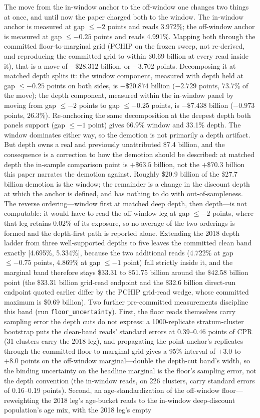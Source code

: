 \documentclass[12pt]{article}
\begin{document}
The move from the in-window anchor to the off-window one changes two things at once, and until now the paper charged both to the window. The in-window anchor is measured at gap $\leq -2$ points and reads 3.972\%; the off-window anchor is measured at gap $\leq -0.25$ points and reads 4.991\%. Mapping both through the committed floor-to-marginal grid (PCHIP on the frozen sweep, not re-derived, and reproducing the committed grid to within \$0.69 billion at every read inside it), that is a move of $-\$28.312$ billion, or $-3.702$ points. Decomposing it at matched depth splits it: the window component, measured with depth held at gap $\leq -0.25$ points on both sides, is $-\$20.874$ billion ($-2.729$ points, 73.7\% of the move); the depth component, measured within the in-window panel by moving from gap $\leq -2$ points to gap $\leq -0.25$ points, is $-\$7.438$ billion ($-0.973$ points, 26.3\%). Re-anchoring the same decomposition at the deepest depth both panels support (gap $\leq -1$ point) gives 66.9\% window and 33.1\% depth. The window dominates either way, so the demotion is not primarily a depth artifact. But depth owns a real and previously unattributed \$7.4 billion, and the consequence is a correction to how the demotion should be described: at matched depth the in-sample comparison point is $+\$63.5$ billion, not the $+\$70.3$ billion this paper narrates the demotion against. Roughly \$20.9 billion of the \$27.7 billion demotion is the window; the remainder is a change in the discount depth at which the anchor is defined, and has nothing to do with out-of-sampleness. The reverse ordering---window first at matched deep depth, then depth---is not computable: it would have to read the off-window leg at gap $\leq -2$ points, where that leg retains 0.02\% of its exposure, so no average of the two orderings is formed and the depth-first path is reported alone. Extending the 2018 depth ladder from three well-supported depths to five leaves the committed clean band exactly [4.695\%, 5.334\%], because the two additional reads (4.722\% at gap $\leq -0.75$ points, 4.869\% at gap $\leq -1$ point) fall strictly inside it, and the marginal band therefore stays \$33.31 to \$51.75 billion around the \$42.58 billion point (the \$33.31 billion grid-read endpoint and the \$32.6 billion direct-run endpoint quoted earlier differ by the PCHIP grid-read wedge, whose committed maximum is \$0.69 billion). Two further pre-committed measurements discipline this band (run \texttt{floor\_uncertainty}). First, the floor reads themselves carry sampling error the depth cuts do not express: a 1000-replicate stratum-cluster bootstrap puts the clean-band reads' standard errors at 0.39--0.46 points of CPR (31 clusters carry the 2018 leg), and propagating the point anchor's replicates through the committed floor-to-marginal grid gives a 95\% interval of $+3.0$ to $+8.0$ points on the off-window marginal---double the depth-cut band's width, so the binding uncertainty on the headline marginal is the floor's sampling error, not the depth convention (the in-window reads, on 226 clusters, carry standard errors of 0.16--0.19 points). Second, an age-standardization of the off-window floor---reweighting the 2018 leg's age-bucket reads to the in-window deep-discount population's age mix, with the 2018 leg's empty 
\end{document}
